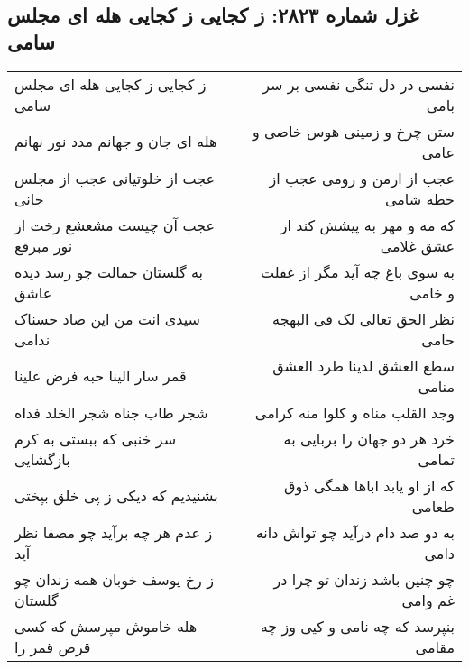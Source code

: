 \begin{center}
\section*{غزل شماره ۲۸۲۳: ز کجایی ز کجایی هله ای مجلس سامی}
\label{sec:2823}
\begin{longtable}{l p{0.5cm} r}
ز کجایی ز کجایی هله ای مجلس سامی
&&
نفسی در دل تنگی نفسی بر سر بامی
\\
هله ای جان و جهانم مدد نور نهانم
&&
ستن چرخ و زمینی هوس خاصی و عامی
\\
عجب از خلوتیانی عجب از مجلس جانی
&&
عجب از ارمن و رومی عجب از خطه شامی
\\
عجب آن چیست مشعشع رخت از نور مبرقع
&&
که مه و مهر به پیشش کند از عشق غلامی
\\
به گلستان جمالت چو رسد دیده عاشق
&&
به سوی باغ چه آید مگر از غفلت و خامی
\\
سیدی انت من این صاد حسناک ندامی
&&
نظر الحق تعالی لک فی البهجه حامی
\\
قمر سار الینا حبه فرض علینا
&&
سطع العشق لدینا طرد العشق منامی
\\
شجر طاب جناه شجر الخلد فداه
&&
وجد القلب مناه و کلوا منه کرامی
\\
سر خنبی که ببستی به کرم بازگشایی
&&
خرد هر دو جهان را بربایی به تمامی
\\
بشنیدیم که دیکی ز پی خلق بپختی
&&
که از او یابد اباها همگی ذوق طعامی
\\
ز عدم هر چه برآید چو مصفا نظر آید
&&
به دو صد دام درآید چو تواش دانه دامی
\\
ز رخ یوسف خوبان همه زندان چو گلستان
&&
چو چنین باشد زندان تو چرا در غم وامی
\\
هله خاموش مپرسش که کسی قرص قمر را
&&
بنپرسد که چه نامی و کیی وز چه مقامی
\\
\end{longtable}
\end{center}
